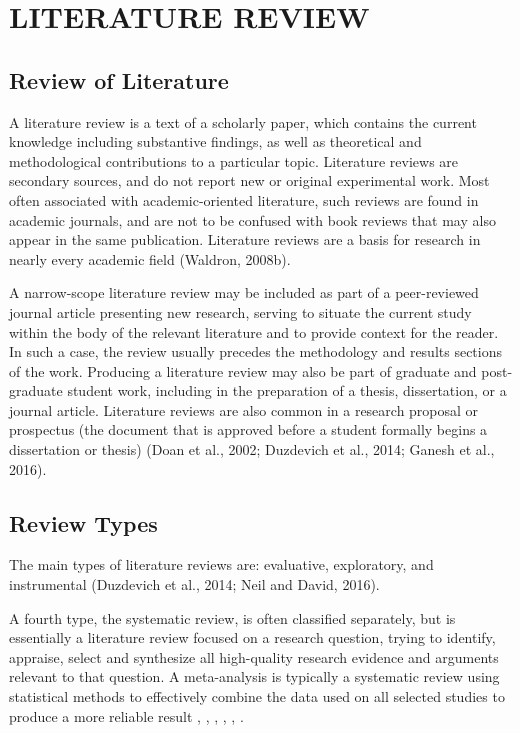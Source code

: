 \chapter{\uppercase{Literature Review}}
\section{Review of Literature}
A literature review is a text of a scholarly paper, which contains the current knowledge 
including substantive findings, as well as theoretical and methodological contributions to 
a particular topic. Literature reviews are secondary sources, and do not report new or 
original experimental work. Most often associated with academic-oriented literature, 
such reviews are found in academic journals, and are not to be confused with book reviews 
that may also appear in the same publication. Literature reviews are a basis for research 
in nearly every academic field (Waldron, 2008b). 

A narrow-scope literature review may be included as part of a peer-reviewed journal article 
presenting new research, serving to situate the current study within the body of the relevant 
literature and to provide context for the reader. In such a case, the review usually precedes 
the methodology and results sections of the work. Producing a literature review may also be 
part of graduate and post-graduate student work, including in the preparation of a thesis, 
dissertation, or a journal article. Literature reviews are also common in a research proposal 
or prospectus (the document that is approved before a student formally begins a dissertation 
or thesis) (Doan et al., 2002; Duzdevich et al., 2014; Ganesh et al., 2016).

\section{Review Types}
The main types of literature reviews are: evaluative, exploratory, and instrumental 
(Duzdevich et al., 2014; Neil and David, 2016). 

A fourth type, the systematic review, is often classified separately, but is essentially a 
literature review focused on a research question, trying to identify, appraise, select and 
synthesize all high-quality research evidence and arguments relevant to that question. 
A meta-analysis is typically a systematic review using statistical methods to effectively 
combine the data used on all selected studies to produce a more reliable result \cite{duzdevich2014dna}, \cite{mohanaprasad2017optimized}, \cite{gilbarg1977elliptic}, \cite{haykin2004kalman}, \cite{haykin2005cognitive}, \cite{knuth1986computers}.

